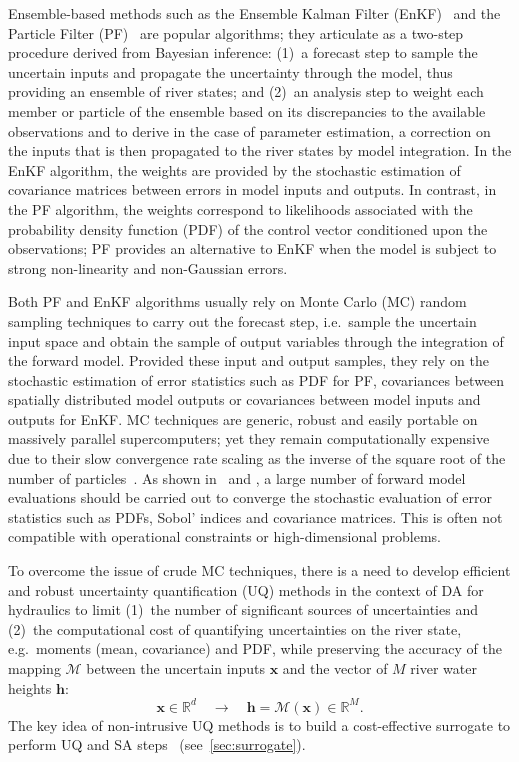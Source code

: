 Ensemble-based methods such as the Ensemble Kalman Filter (EnKF)~\citep{durand2008,moradkhani2005,ELSheikh2013} and the Particle Filter (PF)~\citep{matgen2010,parrish2012} are popular algorithms; they articulate as a two-step procedure derived from Bayesian inference: (1)~a forecast step to sample the uncertain inputs and propagate the uncertainty through the model, thus providing an ensemble of river states; and (2)~an analysis step to weight each member or particle of the ensemble based on its discrepancies to the available observations and to derive in the case of parameter estimation, a correction on the inputs that is then propagated to the river states by model integration. In the EnKF algorithm, the weights are provided by the stochastic estimation of covariance matrices between errors in model inputs and outputs. In contrast, in the PF algorithm, the weights correspond to likelihoods associated with the probability density function (PDF) of the control vector conditioned upon the observations; PF provides an alternative to EnKF when the model is subject to strong non-linearity and non-Gaussian errors. 

Both PF and EnKF algorithms usually rely on Monte Carlo (MC) random sampling techniques to carry out the forecast step, i.e.~sample the uncertain input space and obtain the sample of output variables through the integration of the forward model. Provided these input and output samples, they rely on the stochastic estimation of error statistics such as PDF for PF, covariances between spatially distributed model outputs or covariances between model inputs and outputs for EnKF. MC techniques are generic, robust and easily portable on massively parallel supercomputers; yet they remain computationally expensive due to their slow convergence rate scaling as the inverse of the square root of the number of particles~\citep{lixiu2008}. As shown in~\citet{barthelemy2015} and \citet{bozzi2015}, a large number of forward model evaluations should be carried out to converge the stochastic evaluation of error statistics such as PDFs, Sobol' indices and covariance matrices. This is often not compatible with operational constraints or high-dimensional problems. 

To overcome the issue of crude MC techniques, there is a need to develop efficient and robust uncertainty quantification (UQ) methods in the context of DA for hydraulics to limit (1)~the number of significant sources of uncertainties and (2)~the computational cost of quantifying uncertainties on the river state, e.g.~moments (mean, covariance) and PDF, while preserving the accuracy of the mapping $\mathcal{M}$ between the uncertain inputs $\mathbf{x}$ and the vector of $M$ river water heights $\mathbf{h}$:
\begin{equation}
\mathbf{x} \in \mathbb{R}^d \quad \rightarrow \quad \mathbf{h} = \mathcal{M}(\mathbf{x})\in\mathbb{R}^M.
\end{equation}
The key idea of non-intrusive UQ methods is to build a cost-effective surrogate to perform UQ and SA steps~\citep{iooss2010,iooss2016,lamboni2011,lemaitreknio2010,saltelli2007,storlie2009} (see~\cref{sec:surrogate}).

